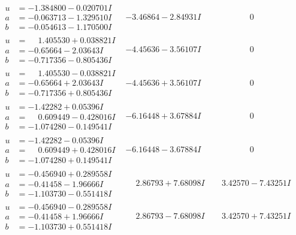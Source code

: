 \documentclass[1p]{elsarticle_modified}
\theoremstyle{definition}
\begin{document}
$$\begin{array}{c|c|c}
\begin{aligned}
u &= -1.384800 - 0.020701 I \\
a &= -0.063713 - 1.329510 I \\
b &= -0.054613 - 1.170500 I\end{aligned}
 & -3.46864 - 2.84931 I & \phantom{-0.000000 } 0 \\ \hline\begin{aligned}
u &= \phantom{-}1.405530 + 0.038821 I \\
a &= -0.65664 - 2.03643 I \\
b &= -0.717356 - 0.805436 I\end{aligned}
 & -4.45636 - 3.56107 I & \phantom{-0.000000 } 0 \\ \hline\begin{aligned}
u &= \phantom{-}1.405530 - 0.038821 I \\
a &= -0.65664 + 2.03643 I \\
b &= -0.717356 + 0.805436 I\end{aligned}
 & -4.45636 + 3.56107 I & \phantom{-0.000000 } 0 \\ \hline\begin{aligned}
u &= -1.42282 + 0.05396 I \\
a &= \phantom{-}0.609449 - 0.428016 I \\
b &= -1.074280 - 0.149541 I\end{aligned}
 & -6.16448 + 3.67884 I & \phantom{-0.000000 } 0 \\ \hline\begin{aligned}
u &= -1.42282 - 0.05396 I \\
a &= \phantom{-}0.609449 + 0.428016 I \\
b &= -1.074280 + 0.149541 I\end{aligned}
 & -6.16448 - 3.67884 I & \phantom{-0.000000 } 0 \\ \hline\begin{aligned}
u &= -0.456940 + 0.289558 I \\
a &= -0.41458 - 1.96666 I \\
b &= -1.103730 - 0.551418 I\end{aligned}
 & \phantom{-}2.86793 + 7.68098 I & \phantom{-}3.42570 - 7.43251 I \\ \hline\begin{aligned}
u &= -0.456940 - 0.289558 I \\
a &= -0.41458 + 1.96666 I \\
b &= -1.103730 + 0.551418 I\end{aligned}
 & \phantom{-}2.86793 - 7.68098 I & \phantom{-}3.42570 + 7.43251 I\\

\end{array}$$
\end{document}
